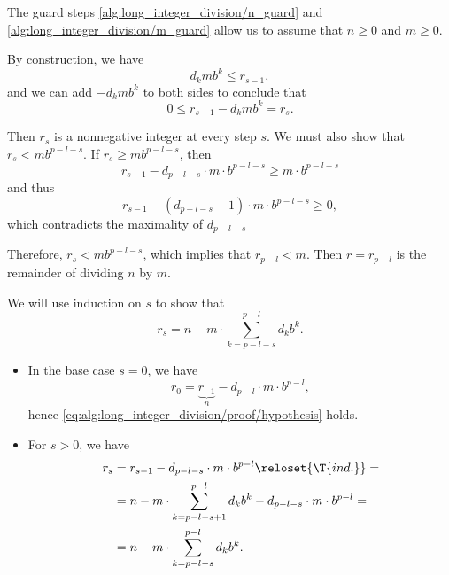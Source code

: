 \begin{defproof}
  The guard steps \ref{alg:long_integer_division/n_guard} and \ref{alg:long_integer_division/m_guard} allow us to assume that \( n \geq 0 \) and \( m \geq 0 \).

   By construction, we have
  \begin{equation*}
    d_k m b^k \leq r_{s - 1},
  \end{equation*}
  and we can add \( -d_k m b^k \) to both sides to conclude that
  \begin{equation*}
    0 \leq r_{s - 1} - d_k m b^k = r_s.
  \end{equation*}

  Then \( r_s \) is a nonnegative integer at every step \( s \). We must also show that \( r_s < m b^{p - l - s} \). If \( r_s \geq m b^{p - l - s} \), then
  \begin{equation*}
    r_{s-1} - d_{p - l - s} \cdot m \cdot b^{p - l - s} \geq m \cdot b^{p - l - s}
  \end{equation*}
  and thus
  \begin{equation*}
    r_{s-1} - (d_{p - l - s} - 1) \cdot m \cdot b^{p - l - s} \geq 0,
  \end{equation*}
  which contradicts the maximality of \( d_{p - l - s} \)

  Therefore, \( r_s < m b^{p - l - s} \), which implies that \( r_{p - l} < m \). Then \( r = r_{p - l} \) is the remainder of dividing \( n \) by \( m \).

  We will use induction on \( s \) to show that
  \begin{equation}\label{eq:alg:long_integer_division/proof/hypothesis}
    r_s = n - m \cdot \sum_{k=p-l-s}^{p-l} d_k b^k.
  \end{equation}

  \begin{itemize}
    \item In the base case \( s = 0 \), we have
    \begin{equation*}
      r_0 = \underbrace{r_{-1}}_n - d_{p-l} \cdot m \cdot b^{p-l},
    \end{equation*}
    hence \eqref{eq:alg:long_integer_division/proof/hypothesis} holds.

    \item For \( s > 0 \), we have
    \begin{align*}
      r_s
      &=
      r_{s-1} - d_{p-l-s} \cdot m \cdot b^{p-l}
      \reloset{\T{ind.}} = \\ &=
      n - m \cdot \sum_{k=p-l-s+1}^{p-l} d_k b^k - d_{p-l-s} \cdot m \cdot b^{p-l}
      = \\ &=
      n - m \cdot \sum_{k=p-l-s}^{p-l} d_k b^k.
    \end{align*}
  \end{itemize}


\end{defproof}
